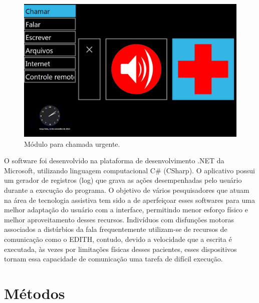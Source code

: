 \documentclass[twoside]{article}
\begin{document}
\begin{multicols}{2}
\begin{figure}[H]
\label{fig:edith_chamar}
  \caption{Módulo para chamada urgente.}
  \centering
    \includegraphics[scale = 0.18]{edith_chamar.png}
\end{figure}

O software foi desenvolvido na plataforma de desenvolvimento .NET da Microsoft, utilizando linguagem computacional C\# (CSharp). O aplicativo possui um gerador de registros (log) que grava as ações desempenhadas pelo usuário durante a execução do programa. O objetivo de vários pesquisadores que atuam na área de tecnologia assistiva tem sido a de aperfeiçoar esses softwares para uma melhor adaptação do usuário com a interface, permitindo menor esforço físico e melhor aproveitamento desses recursos. Indivíduos com disfunções motoras associados a distúrbios da fala frequentemente utilizam-se de recursos de comunicação como o EDITH, contudo, devido a velocidade que a escrita é executada, às vezes por limitações físicas desses pacientes, esses dispositivos tornam essa capacidade de comunicação uma tarefa de difícil execução. 

\section{Métodos}


\end{multicols}
\end{document}
